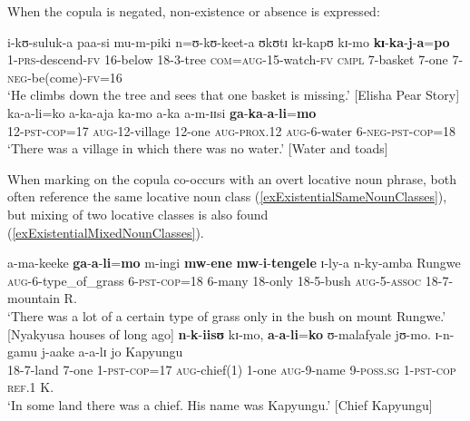 When the copula is negated, non-existence or absence is expressed:
\begin{exe}
\ex \gll i-kʊ-suluk-a paa-si mu-m-piki n=ʊ-kʊ-keet-a ʊkʊtɪ kɪ-kapʊ kɪ-mo \textbf{kɪ}-\textbf{ka}-\textbf{j}-\textbf{a}=\textbf{po}\\
1-\textsc{prs}-descend-\textsc{fv} 16-below 18-3-tree \textsc{com}=\textsc{aug}-15-watch-\textsc{fv} \textsc{cmpl} 7-basket 7-one 7-\textsc{neg}-be(come)-\textsc{fv}=16\\
\glt `He climbs down the tree and sees that one basket is missing.' [Elisha Pear Story]
\ex \label{exExistentialNegated2}\gll ka-a-li=ko a-ka-aja ka-mo a-ka a-m-ɪɪsi \textbf{ga}-\textbf{ka}-\textbf{a}-\textbf{li}=\textbf{mo}\\ 
12-\textsc{pst}-\textsc{cop}=17 \textsc{aug}-12-village 12-one \textsc{aug}-\textsc{prox.12} \textsc{aug}-6-water 6-\textsc{neg}-\textsc{pst}-\textsc{cop}=18\\
\glt `There was a village in which there was no water.' [Water and toads]
\end{exe}

When  marking on the copula co-occurs with an overt locative noun phrase, both often reference the same locative noun class (\ref{exExistentialSameNounClasses}), but mixing of two locative classes is also found (\ref{exExistentialMixedNounClasses}).

\begin{exe}
\ex \label{exExistentialSameNounClasses} \gll a-ma-keeke \textbf{ga}-\textbf{a}-\textbf{li}=\textbf{mo} m-ingi \textbf{mw}-\textbf{ene} \textbf{mw}-\textbf{i}-\textbf{tengele} ɪ-ly-a n-ky-amba Rungwe\\
\textsc{aug}-6-type\_of\_grass 6-\textsc{pst}-\textsc{cop}=18 6-many 18-only 18-5-bush \textsc{aug}-5-\textsc{assoc} 18-7-mountain R.\\
\glt `There was a lot of a certain type of grass only in the bush on mount Rungwe.' [Nyakyusa houses of long ago]
\ex \label{exExistentialMixedNounClasses}\gll \textbf{n}-\textbf{k}-\textbf{iisʊ} kɪ-mo, \textbf{a}-\textbf{a}-\textbf{li}=\textbf{ko} ʊ-malafyale jʊ-mo. ɪ-n-gamu j-aake a-a-lɪ jo Kapyungu\\
18-7-land 7-one 1-\textsc{pst}-\textsc{cop}=17 \textsc{aug}-chief(1) 1-one \textsc{aug}-9-name 9-\textsc{poss.sg} 1-\textsc{pst}-\textsc{cop} \textsc{ref.1} K.\\
\glt `In some land there was a chief. His name was Kapyungu.' [Chief Kapyungu]
\end{exe}

